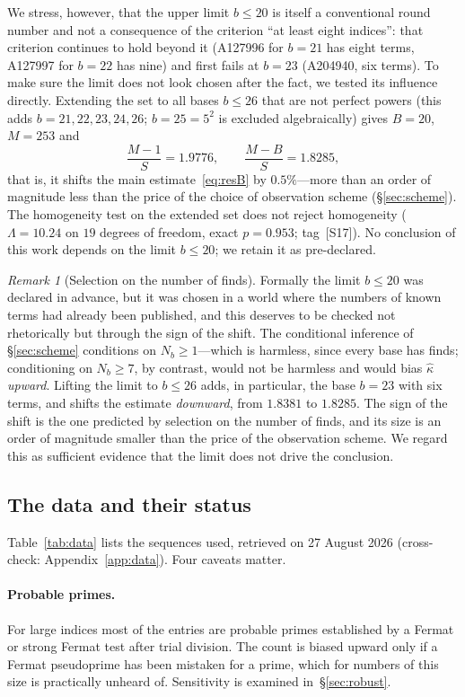 \documentclass[11pt,a4paper]{article}
\theoremstyle{plain}
\theoremstyle{remark}
\newtheorem{remark}{Remark}
\begin{document}
We stress, however, that the upper limit $b\le20$ is itself a conventional round
number and not a consequence of the criterion ``at least eight indices'': that
criterion continues to hold beyond it (A127996 for $b=21$ has eight terms,
A127997 for $b=22$ has nine) and first fails at $b=23$ (A204940, six terms). To
make sure the limit does not look chosen after the fact, we tested its influence
directly. Extending the set to all bases $b\le26$ that are not perfect powers
(this adds $b=21,22,23,24,26$; $b=25=5^2$ is excluded algebraically) gives
$B=20$, $M=253$ and
\[
  \frac{M-1}{S}=1.9776,\qquad \frac{M-B}{S}=1.8285,
\]
that is, it shifts the main estimate~\eqref{eq:resB} by $0.5\%$---more than an
order of magnitude less than the price of the choice of observation scheme
(\S\ref{sec:scheme}). The homogeneity test on the extended set does not reject
homogeneity ($\Lambda=10.24$ on $19$ degrees of freedom, exact $p=0.953$;
tag~[S17]). No conclusion of this work depends on the limit $b\le20$; we retain
it as pre-declared.

\begin{remark}[Selection on the number of finds]\label{rem:selection}
Formally the limit $b\le20$ was declared in advance, but it was chosen in a
world where the numbers of known terms had already been published, and this deserves
to be checked not rhetorically but through the sign of the shift. The
conditional inference of \S\ref{sec:scheme} conditions on $N_b\ge1$---which is
harmless, since every base has finds; conditioning on $N_b\ge7$, by contrast,
would not be harmless and would bias $\hat\kappa$ \emph{upward}. Lifting the
limit to $b\le26$ adds, in particular, the base $b=23$ with six terms, and shifts
the estimate \emph{downward}, from $1.8381$ to $1.8285$. The sign of the shift
is the one predicted by selection on the number of finds, and its size is an
order of magnitude smaller than the price of the observation scheme. We regard
this as sufficient evidence that the limit does not drive the conclusion.
\end{remark}

\subsection{The data and their status}
Table~\ref{tab:data} lists the sequences used, retrieved on 27 August 2026
(cross-check: Appendix~\ref{app:data}). Four caveats matter.

\paragraph{Probable primes.} For large indices most of the entries are probable
primes established by a Fermat or strong Fermat test after trial division. The
count is biased upward only if a Fermat pseudoprime has been mistaken for a
prime, which for numbers of this size is practically unheard of. Sensitivity is
examined in~\S\ref{sec:robust}.
\end{document}
